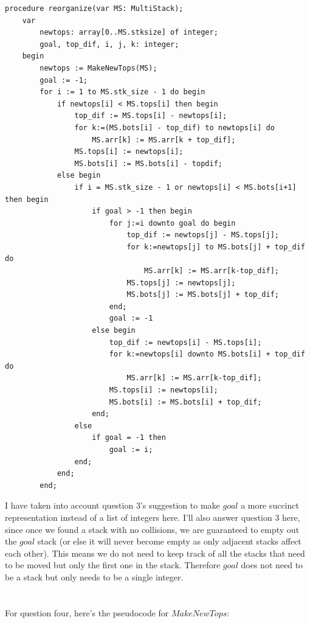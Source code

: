 \documentclass[12pt]{report}
\begin{document}
\begin{verbatim}
procedure reorganize(var MS: MultiStack);
    var 
        newtops: array[0..MS.stksize] of integer;
        goal, top_dif, i, j, k: integer;
    begin
        newtops := MakeNewTops(MS);
        goal := -1;
        for i := 1 to MS.stk_size - 1 do begin
            if newtops[i] < MS.tops[i] then begin
                top_dif := MS.tops[i] - newtops[i];
                for k:=(MS.bots[i] - top_dif) to newtops[i] do
                    MS.arr[k] := MS.arr[k + top_dif];
                MS.tops[i] := newtops[i];
                MS.bots[i] := MS.bots[i] - topdif;
            else begin
                if i = MS.stk_size - 1 or newtops[i] < MS.bots[i+1] then begin
                    if goal > -1 then begin
                        for j:=i downto goal do begin
                            top_dif := newtops[j] - MS.tops[j];
                            for k:=newtops[j] to MS.bots[j] + top_dif do
                                MS.arr[k] := MS.arr[k-top_dif];
                            MS.tops[j] := newtops[j];
                            MS.bots[j] := MS.bots[j] + top_dif;
                        end;
                        goal := -1
                    else begin
                        top_dif := newtops[i] - MS.tops[i];
                        for k:=newtops[i] downto MS.bots[i] + top_dif do
                            MS.arr[k] := MS.arr[k-top_dif];
                        MS.tops[i] := newtops[i];
                        MS.bots[i] := MS.bots[i] + top_dif;
                    end;
                else
                    if goal = -1 then
                        goal := i;
                end;
            end;
        end;
\end{verbatim}
I have taken into account question 3's suggestion 
to make $goal$ a more succinct representation instead of a list of integers here.
I'll also answer question 3 here, since once we found a stack with no collisions,
we are guaranteed to empty out the $goal$ stack 
(or else it will never become empty as only adjacent stacks affect each other).
This means we do not need to keep track of all the stacks that need to be moved 
but only the first one in the stack. 
Therefore $goal$ does not need to be a stack but only needs to be a single integer.\\\\
\pagebreak
\\For question four, here's the pseudocode for $MakeNewTops$:
\end{document}
